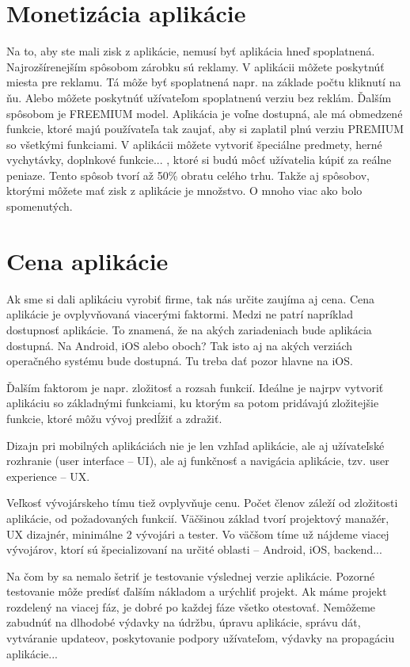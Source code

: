 \documentclass[10pt,twoside,slovak,a4paper]{article}
\begin{document}
\cite{wiki1, pixelfield}



\section{Monetizácia aplikácie}
\quad Na to, aby ste mali zisk z aplikácie, nemusí byť aplikácia hneď spoplatnená. Najrozšírenejším spôsobom zárobku sú reklamy. V aplikácii môžete poskytnúť miesta pre reklamu. Tá môže byť spoplatnená napr. na základe počtu kliknutí na ňu. Alebo môžete poskytnúť užívateľom spoplatnenú verziu bez reklám. Ďalším spôsobom je FREEMIUM model. Aplikácia je voľne dostupná, ale má obmedzené funkcie, ktoré majú používateľa tak zaujať, aby si zaplatil plnú verziu PREMIUM so všetkými funkciami. V aplikácii môžete vytvoriť špeciálne predmety, herné vychytávky, doplnkové funkcie... , ktoré si budú môcť užívatelia kúpiť za reálne peniaze. Tento spôsob tvorí až 50\% obratu celého trhu. Takže aj spôsobov, ktorými môžete mať zisk z aplikácie je množstvo. O mnoho viac ako bolo spomenutých.	\cite{pixelfield}



\section{Cena aplikácie}
\quad Ak sme si dali aplikáciu vyrobiť firme, tak nás určite zaujíma aj cena. Cena aplikácie je ovplyvňovaná viacerými faktormi. Medzi ne patrí napríklad dostupnosť aplikácie. To znamená, že na akých zariadeniach bude aplikácia dostupná. Na Android, iOS alebo oboch? Tak isto aj na akých verziách operačného systému bude dostupná. Tu treba dať pozor hlavne na iOS.

Ďalším faktorom je napr. zložitosť a rozsah funkcií. Ideálne je najrpv vytvoriť aplikáciu so základnými funkciami, ku ktorým sa potom pridávajú zložitejšie funkcie, ktoré môžu vývoj predĺžiť a zdražiť.

Dizajn pri mobilných aplikáciách nie je len vzhľad aplikácie, ale aj užívateľské rozhranie (user interface – UI), ale aj funkčnosť a navigácia aplikácie, tzv. user experience – UX.

Veľkosť vývojárskeho tímu tiež ovplyvňuje cenu. Počet členov záleží od zložitosti aplikácie, od požadovaných funkcií. Väčšinou základ tvorí projektový manažér, UX dizajnér, minimálne 2 vývojári a tester. Vo väčšom tíme už nájdeme viacej vývojárov, ktorí sú špecializovaní na určité oblasti – Android, iOS, backend...

Na čom by sa nemalo šetriť je testovanie výslednej verzie aplikácie. Pozorné testovanie môže predísť ďalším nákladom a urýchliť projekt. Ak máme projekt rozdelený na viacej fáz, je dobré po každej fáze všetko otestovať.
Nemôžeme zabudnúť na dlhodobé výdavky na údržbu, úpravu aplikácie, správu dát, vytváranie updateov, poskytovanie podpory užívateľom, výdavky na propagáciu aplikácie...	\cite{pixelfield}
\end{document}

